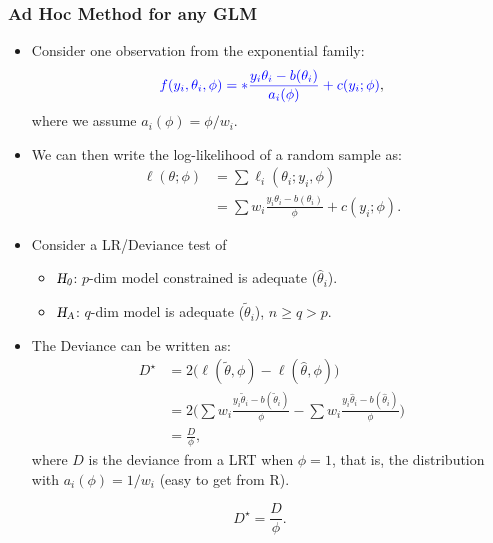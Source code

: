 \documentclass[oneside]{book}\usepackage[]{graphicx}\usepackage[svgnames]{xcolor}
\let\exp\relax%
\newcommand{\HN}{\textsl{H}_{\textsl{0}}}%
\newcommand{\HA}{\textsl{H}_{\textsl{A}}}%
\begin{document}
\subsubsection*{Ad Hoc Method for any GLM}
\begin{itemize}
    \item Consider one observation from the exponential family:
          \[ \textcolor{Blue}{f(y_i,\theta_i,\phi)=\exp*{\frac{y_i\theta_i-b(\theta_i)}{a_i(\phi)}+c(y_i;\phi)}}, \]
          where we assume $ a_i(\phi)=\phi/w_i $.
    \item We can then write the log-likelihood of a random sample as:
          \begin{align*}
              \ell(\theta;\phi)
               & =\sum \ell_i(\theta_i;y_i,\phi)                             \\
               & =\sum w_i \frac{y_i\theta_i-b(\theta_i)}{\phi}+c(y_i;\phi).
          \end{align*}
    \item Consider a LR/Deviance test of
          \begin{itemize}
              \item $ \HN $: $ p $-dim model constrained is adequate ($ \hat{\theta}_i $).
              \item $ \HA $: $ q $-dim model is adequate ($ \tilde{\theta}_i $), $ n\ge q>p $.
          \end{itemize}
    \item The Deviance can be written as:
          \begin{align*}
              D^\star
               & =2\bigl(\ell(\tilde{\theta},\phi)-\ell(\hat{\theta},\phi)\bigr)                                                                            \\
               & =2\biggl(\sum  w_i \frac{y_i\tilde{\theta}_i-b(\tilde{\theta}_i)}{\phi} -\sum w_i \frac{y_i\hat{\theta}_i-b(\hat{\theta}_i)}{\phi} \biggr) \\
               & =\frac{D}{\phi},
          \end{align*}
          where $ D $ is the deviance from a LRT when $ \phi=1 $, that is, the distribution with $ a_i(\phi)=1/w_i $ (easy to get from R).
\end{itemize}
\[ D^\star=\frac{D}{\phi}. \]
\end{document}
